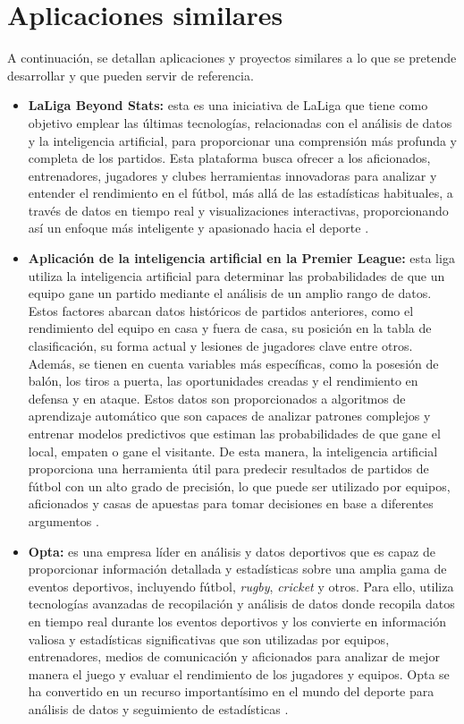 \section{Aplicaciones similares}
A continuación, se detallan aplicaciones y proyectos similares a lo que se pretende desarrollar y que pueden servir de referencia.
\begin{itemize}
\item \textbf{LaLiga Beyond Stats:}
esta es una iniciativa de LaLiga que tiene como objetivo emplear las últimas tecnologías, relacionadas con el análisis de datos y la inteligencia artificial, para proporcionar una comprensión más profunda y completa de los partidos. Esta plataforma busca ofrecer a los aficionados, entrenadores, jugadores y clubes herramientas innovadoras para analizar y entender el rendimiento en el fútbol, más allá de las estadísticas habituales, a través de datos en tiempo real y visualizaciones interactivas, proporcionando así un enfoque más inteligente y apasionado hacia el deporte \cite{beyondstats}.

\item \textbf{Aplicación de la inteligencia artificial en la Premier League:}
esta liga utiliza la inteligencia artificial para determinar las probabilidades de que un equipo gane un partido mediante el análisis de un amplio rango de datos. Estos factores abarcan datos históricos de partidos anteriores, como el rendimiento del equipo en casa y fuera de casa, su posición en la tabla de clasificación, su forma actual y lesiones de jugadores clave entre otros. Además, se tienen en cuenta variables más específicas, como la posesión de balón, los tiros a puerta, las oportunidades creadas y el rendimiento en defensa y en ataque. Estos datos son proporcionados a algoritmos de aprendizaje automático que son capaces de analizar patrones complejos y entrenar modelos predictivos que estiman las probabilidades de que gane el local, empaten o gane el visitante. De esta manera, la inteligencia artificial proporciona una herramienta útil para predecir resultados de partidos de fútbol con un alto grado de precisión, lo que puede ser utilizado por equipos, aficionados y casas de apuestas para tomar decisiones en base a diferentes argumentos \cite{oracle} \cite{iaFutbol}.

\item \textbf{Opta:}
es una empresa líder en análisis y datos deportivos que es capaz de proporcionar información detallada y estadísticas sobre una amplia gama de eventos deportivos, incluyendo fútbol, \textit{rugby}, \textit{cricket} y otros. Para ello, utiliza tecnologías avanzadas de recopilación y análisis de datos donde recopila datos en tiempo real durante los eventos deportivos y los convierte en información valiosa y estadísticas significativas que son utilizadas por equipos, entrenadores, medios de comunicación y aficionados para analizar de mejor manera el juego y evaluar el rendimiento de los jugadores y equipos. Opta se ha convertido en un recurso importantísimo en el mundo del deporte para análisis de datos y seguimiento de estadísticas \cite{opta}.


\end{itemize}

